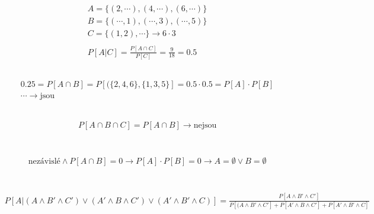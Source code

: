 \documentclass[a4paper]{article}
\begin{document}
\thispagestyle{fancy} %
{}

\section{}
\subsection{}
\begin{align*}
& A = \{ (2, \cdots), (4, \cdots), (6, \cdots) \} \\
& B = \{ (\cdots, 1), (\cdots, 3), (\cdots, 5) \} \\
& C = \{ (1,2), \cdots \} \rightarrow 6 \cdot 3 \\
\\
& P[A|C] = \frac{P[A\cap C]}{P[C]} = \frac{9}{18} = 0.5
\end{align*}
\subsection{}
\begin{align*}
& 0.25 = P[A\cap B] = P[(\{2,4,6\},\{1,3,5\}] = 0.5 \cdot 0.5 = P[A] \cdot P[B] \\
& \cdots \rightarrow \text{jsou}
\end{align*}
\subsection{}
\begin{align*}
& P[A\cap B \cap C] = P[A \cap B] \rightarrow \text{nejsou}
\end{align*}

\section{}
\begin{align*}
& \text{nezávislé} \wedge P[A\cap B] = 0 \rightarrow P[A]\cdot P[B] = 0 \rightarrow A = \emptyset \vee B = \emptyset
\end{align*}

\section{}
\subsection{}
\begin{align*}
& P[A|(A\wedge B' \wedge C') \vee (A'\wedge B \wedge C') \vee (A'\wedge B' \wedge C)] = \frac{P[A\wedge B' \wedge C']}{P[(A\wedge B' \wedge C'] + P[A'\wedge B \wedge C'] + P[A'\wedge B' \wedge C]}
\end{align*}
\end{document}
